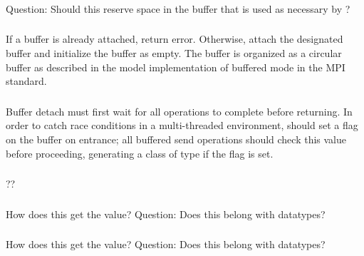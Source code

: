 \documentclass{article}
\begin{document}
\subsubsection{}
Question:  Should this reserve space in the buffer that is used as
necessary by ?

\subsubsection{}
If a buffer is already attached, return error.
Otherwise, attach the designated buffer and initialize the buffer as empty.
The buffer is organized as a circular buffer as described in the model
implementation of buffered mode in the MPI standard.

\subsubsection{}
Buffer detach must first wait for all operations to complete before
returning.  
In order to catch race conditions in a multi-threaded environment, 
 should set a flag on the buffer on entrance; all
buffered send operations should check this value before proceeding, generating
a  class of type  if the flag is
set.

\subsubsection{}
\begin{adi3}
\begin{mmadi}??
\begin{core}
\end{core}
\end{mmadi}
\end{adi3}

\subsubsection{}
How does this get the value?
Question: Does this belong with datatypes?

\subsubsection{}
How does this get the value?
Question: Does this belong with datatypes?
\end{document}
